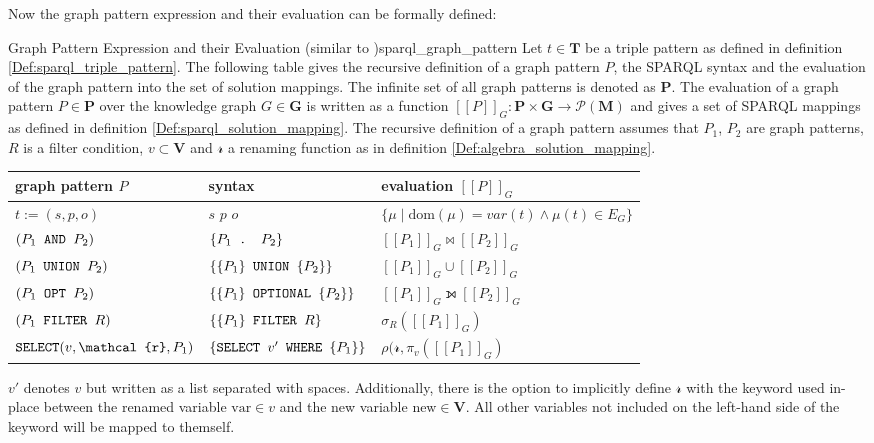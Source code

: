 Now the graph pattern expression and their evaluation can be formally defined:

\begin{Def}{Graph Pattern Expression and their Evaluation (similar to \cite{perez2009semantics, schmidt2010foundations})}{sparql_graph_pattern}
Let $t\in \mathbf{T}$ be a triple pattern as defined in definition \ref{Def:sparql_triple_pattern}. The following table gives the recursive definition of a graph pattern $P$, the SPARQL syntax and the evaluation of the graph pattern into the set of solution mappings. The infinite set of all graph patterns is denoted as $\mathbf{P}$. The evaluation of a graph pattern $P \in \mathbf{P}$ over the knowledge graph $G \in \mathbf{G}$ is written as a function $[[P]]_G: \mathbf{P} \times \mathbf{G} \to \mathcal{P}(\mathbf{M})$ and gives a set of SPARQL mappings as defined in definition \ref{Def:sparql_solution_mapping}.  The recursive definition of a graph pattern assumes that $P_1$, $P_2$ are graph patterns, $R$ is a filter condition, $v \subset \mathbf{V}$ and $\mathcal{r}$ a renaming function as in definition \ref{Def:algebra_solution_mapping}.
\begin{center}
            \begin{tabular}{l|l|l}
             \toprule
             graph pattern $P$ & syntax & evaluation $[[P]]_G$ \\
             \midrule
             \midrule
             $t := (s,p,o)$ & $s$ $p$ $o$ & $\{\mu \mid \text{dom}(\mu) = var(t) \land \mu(t) \in E_G\}$\\
             $(P_1 \text{\texttt{ AND }} P_2)$ & $\{P_1 \text{\texttt{ . }} P_2\}$ &  $[[P_1]]_G \bowtie [[P_2]]_G$ \\
             $(P_1 \text{\texttt{ UNION }} P_2)$ & $\{\{P_1\}\text{\texttt{ UNION }}\{P_2\}\}$ & $[[P_1]]_G \cup [[P_2]]_G$\\
             $(P_1 \text{\texttt{ OPT }} P_2)$ & $\{\{P_1\}\text{\texttt{ OPTIONAL }}\{P_2\}\}$ & $[[P_1]]_G \leftouterjoin [[P_2]]_G$\\
             $(P_1 \text{\texttt{ FILTER }} R)$ &  $\{\{P_1\}\text{\texttt{ FILTER }} R\}$ & $\sigma_R([[P_1]]_G)$\\
             $\text{\uri{SELECT}}(v, \mathcal{r}, P_1)$ & $\{\text{\texttt{SELECT }} v' \text{\texttt{ WHERE }} \{P_1\}\}$ & $\rho(\mathcal{r}, \pi_v([[P_1]]_G)$\\
             \bottomrule
        \end{tabular}
\end{center}
$v'$ denotes $v$ but written as a list separated with spaces. Additionally, there is the option to implicitly define $\mathcal{r}$ with the  keyword used in-place between the renamed variable $\text{var} \in v$ and the new variable $\text{new} \in \mathbf{V}$. All other variables not included on the left-hand side of the  keyword will be mapped to themself.
\end{Def}

